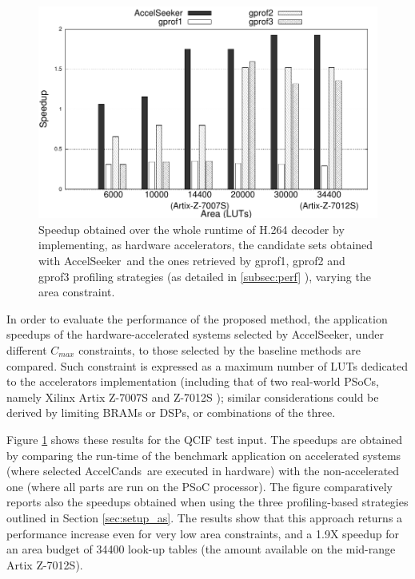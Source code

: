 \documentclass[]{usiinfthesis}
\newcommand{\aseeker}{{AccelSeeker}}
\newcommand{\candidates}{{AccelCand}s}
\begin{document}
   \begin{figure}[!t]
  \centering
  \includegraphics[width=0.8\linewidth]{figs/h264_speedup.pdf}
  \caption{Speedup obtained over the whole runtime of H.264 decoder by implementing, as hardware accelerators, the candidate sets
  obtained with \aseeker\ and the ones retrieved by gprof1, gprof2 and gprof3 profiling  strategies (as detailed in \ref{subsec:perf} ), varying the area constraint.}
  \label{fig:speedups}
\end{figure}

In order to evaluate the performance of the proposed method, the
application speedups of the hardware-accelerated systems selected by
\aseeker, under different
$C_{max}$ constraints, to those selected by the baseline methods are compared.  
Such constraint is expressed as a maximum number
of LUTs dedicated to the accelerators implementation (including that
of two real-world PSoCs, namely Xilinx Artix Z-7007S and Z-7012S
\cite{ZynqMar17}); similar considerations could be derived by limiting BRAMs 
or DSPs, or combinations of the three.\par

Figure \ref{fig:speedups} shows these results for the QCIF test input.
The speedups are obtained by comparing the run-time of the benchmark 
application on accelerated systems (where selected \candidates\ are 
executed in hardware) with the non-accelerated one (where all parts are 
run on the PSoC processor).
The figure comparatively
reports also the speedups obtained when using the three
profiling-based strategies outlined in Section \ref{sec:setup_as}.
The results show that this approach returns a performance increase
even for very low area constraints, and a 1.9X speedup for an area
budget of 34400 look-up tables (the amount available on the mid-range
Artix Z-7012S).\par
\end{document}
